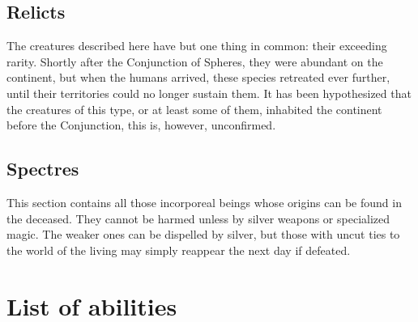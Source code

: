 \documentclass[parskip=full,11pt,%
footheight=38pt]{scrreport}
\begin{document}

\section{Relicts}
The creatures described here have but one thing in common: their exceeding rarity. Shortly after the Conjunction
of Spheres, they were abundant on the continent, but when the humans arrived, these species retreated ever further,
until their territories could no longer sustain them. It has been hypothesized that the creatures of this type, or
at least some of them, inhabited the continent before the Conjunction, this is, however, unconfirmed.


\section{Spectres}\label{monster:spectre}
This section contains all those incorporeal beings whose origins can be found in the deceased. They cannot be
harmed unless by silver weapons or specialized magic. The weaker ones can be dispelled by silver, but those
with uncut ties to the world of the living may simply reappear the next day if defeated.


\chapter{List of abilities}

\abilitylist
\end{document}
